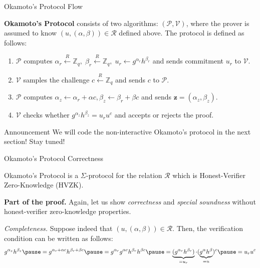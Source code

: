 \documentclass[xcolor={usenames,dvipsnames}]{beamer}
\begin{document}
    \begin{frame}{Okamoto's Protocol Flow}
        \begin{definition}
            \textbf{Okamoto's Protocol} consists of two algorithms: $(\mathcal{P}, \mathcal{V})$, where the prover is assumed to know $(u,(\alpha,\beta)) \in \mathcal{R}$ defined above. The protocol is defined as follows:\pause
            \begin{enumerate}
                \item $\mathcal{P}$ computes $\alpha_r \xleftarrow{R} \mathbb{Z}_q, \; \beta_r \xleftarrow{R} \mathbb{Z}_q, \; u_r \gets g^{\alpha_r}h^{\beta_r}$ and sends commitment $u_r$ to $\mathcal{V}$.\pause
                \item $\mathcal{V}$ samples the challenge $c \xleftarrow{R} \mathbb{Z}_q$ and sends $c$ to $\mathcal{P}$.\pause
                \item $\mathcal{P}$ computes $\alpha_z \gets \alpha_r + \alpha c, \beta_z \gets \beta_r + \beta c$ and sends $\mathbf{z} = (\alpha_z,\beta_z)$.\pause
                \item $\mathcal{V}$ checks whether $g^{\alpha_z}h^{\beta_z} = u_r u^c$ and accepts or rejects the proof.\pause
            \end{enumerate}
        \end{definition}

        \begin{alertblock}{Announcement}
            We will code the non-interactive Okamoto's protocol in the next section! Stay tuned!
        \end{alertblock}
    \end{frame}

    \begin{frame}{Okamoto's Protocol Correctness}
        \begin{theorem}
            Okamoto's Protocol is a $\Sigma$-protocol for the relation $\mathcal{R}$ which is Honest-Verifier Zero-Knowledge (HVZK).\pause
        \end{theorem}
        
        \textbf{Part of the proof.} Again, let us show \textit{correctness} and \textit{special soundness} without honest-verifier zero-knowledge properties.\pause
        
        \textit{Completeness.} Suppose indeed that $(u,(\alpha,\beta)) \in \mathcal{R}$. Then, the verification condition can be written as follows:\pause
        \begin{equation*}
            g^{\alpha_z}h^{\beta_z} \pause = g^{\alpha_r + \alpha c}h^{\beta_r + \beta c} \pause = g^{\alpha_r}g^{\alpha c}h^{\beta_r}h^{\beta c} \pause = \underbrace{(g^{\alpha_r}h^{\beta_r})}_{=u_r} \cdot (\underbrace{g^{\alpha}h^{\beta}}_{=u})^c \pause = u_r u^c
        \end{equation*}
    \end{frame}
\end{document}

